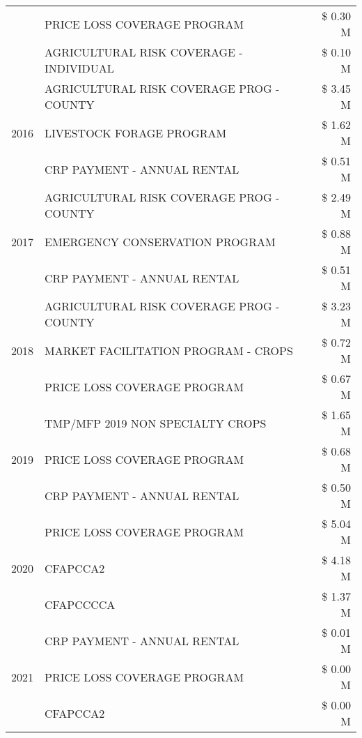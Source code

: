 \begin{tabular}{llr}
 & PRICE LOSS COVERAGE PROGRAM & \$ 0.30 M \\
 & AGRICULTURAL RISK COVERAGE - INDIVIDUAL & \$ 0.10 M \\
\cline{1-3}
\multirow[t]{3}{*}{2016} & AGRICULTURAL RISK COVERAGE PROG - COUNTY      & \$ 3.45 M \\
 & LIVESTOCK FORAGE PROGRAM                      & \$ 1.62 M \\
 & CRP PAYMENT - ANNUAL RENTAL                   & \$ 0.51 M \\
\cline{1-3}
\multirow[t]{3}{*}{2017} & AGRICULTURAL RISK COVERAGE PROG - COUNTY & \$ 2.49 M \\
 & EMERGENCY CONSERVATION PROGRAM & \$ 0.88 M \\
 & CRP PAYMENT - ANNUAL RENTAL & \$ 0.51 M \\
\cline{1-3}
\multirow[t]{3}{*}{2018} & AGRICULTURAL RISK COVERAGE PROG - COUNTY & \$ 3.23 M \\
 & MARKET FACILITATION PROGRAM - CROPS & \$ 0.72 M \\
 & PRICE LOSS COVERAGE PROGRAM & \$ 0.67 M \\
\cline{1-3}
\multirow[t]{3}{*}{2019} & TMP/MFP 2019 NON SPECIALTY CROPS & \$ 1.65 M \\
 & PRICE LOSS COVERAGE PROGRAM & \$ 0.68 M \\
 & CRP PAYMENT - ANNUAL RENTAL & \$ 0.50 M \\
\cline{1-3}
\multirow[t]{3}{*}{2020} & PRICE LOSS COVERAGE PROGRAM & \$ 5.04 M \\
 & CFAPCCA2 & \$ 4.18 M \\
 & CFAPCCCCA & \$ 1.37 M \\
\cline{1-3}
\multirow[t]{3}{*}{2021} & CRP PAYMENT - ANNUAL RENTAL & \$ 0.01 M \\
 & PRICE LOSS COVERAGE PROGRAM & \$ 0.00 M \\
 & CFAPCCA2 & \$ 0.00 M \\
\cline{1-3}
\bottomrule
\end{tabular}
